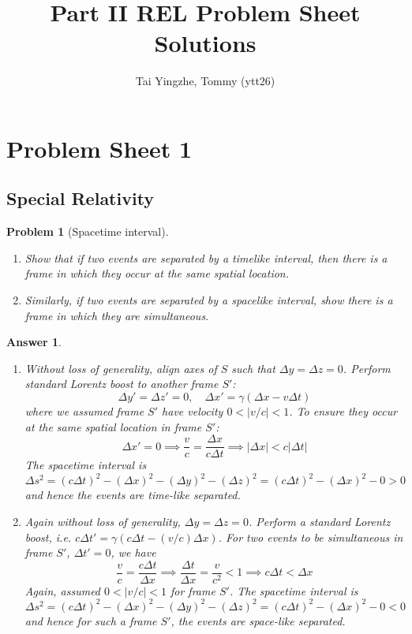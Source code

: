 \documentclass[a4paper]{article}
\title{\textbf{Part II REL Problem Sheet Solutions}}
\author{Tai Yingzhe, Tommy (ytt26)}
\date{}
\newtheorem{ans}{Answer}[subsection]
\theoremstyle{new}
\newtheorem{qns}{Problem}[section]
\begin{document}
\maketitle
\tableofcontents
\newpage
\section{Problem Sheet 1}
\subsection*{Special Relativity}
\begin{qns}[Spacetime interval]\leavevmode
\begin{enumerate}[label=(\alph*)]
\item Show that if two events are separated by a timelike interval, then there is a frame in which they occur at the same spatial location.
\item Similarly, if two events are separated by a spacelike interval, show there is a frame in which they are simultaneous.
\end{enumerate}
\end{qns}
\begin{ans}\leavevmode
\begin{enumerate}[label=(\alph*)]
\item Without loss of generality, align axes of $S$ such that $\Delta y=\Delta z=0$. Perform standard Lorentz boost to another frame $S'$:
$$\Delta y'=\Delta z'=0,\quad\Delta x'=\gamma(\Delta x-v\Delta t)$$
where we assumed frame $S'$ have velocity $0<|v/c|<1$. To ensure they occur at the same spatial location in frame $S'$:
$$\Delta x'=0\implies\frac{v}{c}=\frac{\Delta x}{c\Delta t}\implies|\Delta x|<c|\Delta t|$$
The spacetime interval is
$$\Delta s^2=(c\Delta t)^2-(\Delta x)^2-(\Delta y)^2-(\Delta z)^2=(c\Delta t)^2-(\Delta x)^2-0>0$$
and hence the events are time-like separated.
\item Again without loss of generality, $\Delta y=\Delta z=0$. Perform a standard Lorentz boost, i.e. $c\Delta t'=\gamma(c\Delta t-(v/c)\Delta x)$. For two events to be simultaneous in frame $S'$, $\Delta t'=0$, we have $$\frac{v}{c}=\frac{c\Delta t}{\Delta x}\implies\frac{\Delta t}{\Delta x}=\frac{v}{c^2}<1\implies c\Delta t<\Delta x$$
Again, assumed $0<|v/c|<1$ for frame $S'$. The spacetime interval is
$$\Delta s^2=(c\Delta t)^2-(\Delta x)^2-(\Delta y)^2-(\Delta z)^2=(c\Delta t)^2-(\Delta x)^2-0<0$$
and hence for such a frame $S'$, the events are space-like separated.
\end{enumerate}
\end{ans}
\end{document}
